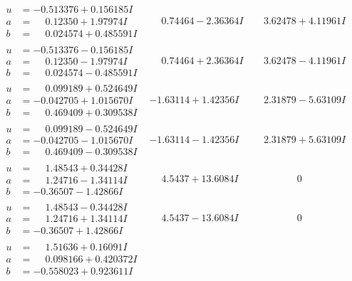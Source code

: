 \documentclass[1p]{elsarticle_modified}
\theoremstyle{definition}
\begin{document}
$$\begin{array}{c|c|c}
\begin{aligned}
u &= -0.513376 + 0.156185 I \\
a &= \phantom{-}0.12350 + 1.97974 I \\
b &= \phantom{-}0.024574 + 0.485591 I\end{aligned}
 & \phantom{-}0.74464 - 2.36364 I & \phantom{-}3.62478 + 4.11961 I \\ \hline\begin{aligned}
u &= -0.513376 - 0.156185 I \\
a &= \phantom{-}0.12350 - 1.97974 I \\
b &= \phantom{-}0.024574 - 0.485591 I\end{aligned}
 & \phantom{-}0.74464 + 2.36364 I & \phantom{-}3.62478 - 4.11961 I \\ \hline\begin{aligned}
u &= \phantom{-}0.099189 + 0.524649 I \\
a &= -0.042705 + 1.015670 I \\
b &= \phantom{-}0.469409 + 0.309538 I\end{aligned}
 & -1.63114 + 1.42356 I & \phantom{-}2.31879 - 5.63109 I \\ \hline\begin{aligned}
u &= \phantom{-}0.099189 - 0.524649 I \\
a &= -0.042705 - 1.015670 I \\
b &= \phantom{-}0.469409 - 0.309538 I\end{aligned}
 & -1.63114 - 1.42356 I & \phantom{-}2.31879 + 5.63109 I \\ \hline\begin{aligned}
u &= \phantom{-}1.48543 + 0.34428 I \\
a &= \phantom{-}1.24716 - 1.34114 I \\
b &= -0.36507 - 1.42866 I\end{aligned}
 & \phantom{-}4.5437 + 13.6084 I & \phantom{-0.000000 } 0 \\ \hline\begin{aligned}
u &= \phantom{-}1.48543 - 0.34428 I \\
a &= \phantom{-}1.24716 + 1.34114 I \\
b &= -0.36507 + 1.42866 I\end{aligned}
 & \phantom{-}4.5437 - 13.6084 I & \phantom{-0.000000 } 0 \\ \hline\begin{aligned}
u &= \phantom{-}1.51636 + 0.16091 I \\
a &= \phantom{-}0.098166 + 0.420372 I \\
b &= -0.558023 + 0.923611 I\end{aligned}

\end{array}$$
\end{document}
